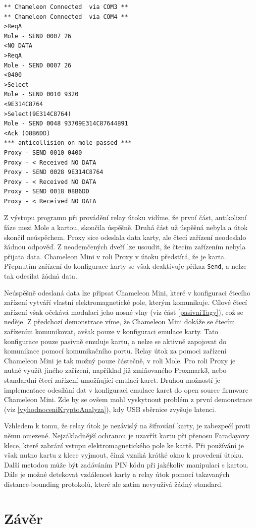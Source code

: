 \begin{lstlisting}[caption=Výstup programu MifareProxy.exe při demonstraci, label={relayZaznam}]
** Chameleon Connected  via COM3 **
** Chameleon Connected  via COM4 **
>ReqA
Mole - SEND 0007 26
<NO DATA
>ReqA
Mole - SEND 0007 26
<0400
>Select
Mole - SEND 0010 9320
<9E314C8764
>Select(9E314C8764)
Mole - SEND 0048 93709E314C87644B91
<Ack (08B6DD)
*** anticollision on mole passed ***
Proxy - SEND 0010 0400
Proxy - < Received NO DATA
Proxy - SEND 0028 9E314C8764
Proxy - < Received NO DATA
Proxy - SEND 0018 08B6DD
Proxy - < Received NO DATA
\end{lstlisting}
Z výstupu programu při provádění relay útoku vidíme, že první část, antikolizní fáze mezi Mole a kartou, skončila úspěšně. Druhá část už úspěšná nebyla a útok skončil neúspěchem. Proxy sice odeslala data karty, ale čtecí zařízení neodeslalo žádnou odpověď. Z neodemčených dveří lze usoudit, že čtecím zařízením nebyla přijata data. Chameleon Mini v roli Proxy v útoku předstírá, že je karta. Přepnutím zařízení do konfigurace karty se však deaktivuje příkaz \verb|Send|, a nelze tak odesílat žádná data. \par
Neúspěšně odeslaná data lze připsat Chameleon Mini, které v konfiguraci čtecího zařízení vytváří vlastní elektromagnetické pole, kterým komunikuje. Cílové čtecí zařízení však očekává modulaci jeho nosné vlny (viz část \ref{pasivniTagy}), což se neděje. Z předchozí demonstrace víme, že Chameleon Mini dokáže se čtecím zařízením komunikovat, avšak pouze v konfiguraci emulace karty. Tato konfigurace pouze pasivně emuluje kartu, a nelze se aktivně zapojovat do komunikace pomocí komunikačního portu. Relay útok za pomoci zařízení Chameleon Mini je tak možný pouze částečně, v roli Mole. Pro roli Proxy je nutné využít jiného zařízení, například již zmiňovaného Proxmark3, nebo standardní čtecí zařízení umožňující emulaci karet. Druhou možností je implementace odesílání dat v konfiguraci emulace karet do open source firmware Chameleon Mini. Zde by se ovšem mohl vyskytnout problém z první demonstrace (viz \ref{vyhodnoceniKryptoAnalyza}), kdy USB sběrnice zvyšuje latenci.\par
Vzhledem k tomu, že relay útok je nezávislý na šifrování karty, je zabezpečí proti němu omezené. Nejzákladnější ochranou je uzavřít kartu při přenosu Faradayovy klece, které zabrání vstupu elektromagnetického pole ke kartě. Při používání je však nutno kartu z klece vyjmout, čímž vzniká krátké okno k provedení útoku. Další metodou může být zadáváním PIN kódu při jakékoliv manipulaci s kartou. Dále je možné detekovat vzdálenost karty a relay útok pomocí takzvaných {distance-bounding} protokolů, které ale zatím nevyužívá žádný standard.

\chapter{Závěr}
\label{zaver}

